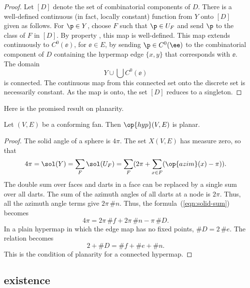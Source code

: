 \begin{proof} Let $[D]$ denote the set of combinatorial components of
$D$.  There is a well-defined continuous (in fact, locally constant)
function from $Y$ onto $[D]$ given as follows.  For $\p\in Y$,
choose $F$ such that $\p\in U_F$ and send $\p$ to the class of $F$
in $[D]$.  By property , this map is
well-defined. This map extends continuously to $C^0(\ee)$, for
$\ee\in E$, by sending $\p\in C^0(\ee)$ to the combinatorial
component of $D$ containing the hypermap edge $\{x,y\}$  that
corresponds with $\ee$.  The domain
\begin{displaymath}
Y\cup \bigcup C^0(\ee)
\end{displaymath}
is connected.  The continuous map from this connected set onto the
discrete set is necessarily constant.  As the map is onto, the set
$[D]$ reduces to a singleton.
\end{proof}

Here is the promised result on planarity.

\begin{lemma}[]  
\label{lemma:cfplanar}
Let $(V,E)$ be a conforming fan.  
Then $\op{hyp}(V,E)$ is planar.
\end{lemma}
%
%

\begin{proof}  The solid angle of a sphere is $4\pi$.  The set $X(V,E)$
has measure zero, so that
\begin{equation}\label{eqn:solid-sum}
4\pi = \sol(Y)= \sum_F \sol(U_F) = 
\sum_F ( 2\pi + \sum_{x\in F} (\op{azim}(x)-\pi) ).
\end{equation}
The double sum over faces and darts in a face can be replaced by
a single sum over all darts.  
The sum of the azimuth angles of all darts at a node is $2\pi$. Thus,
all the azimuth angle terms give $2\pi\,\#n$.
Thus, the formula~(\ref{eqn:solid-sum}) becomes
\begin{displaymath}
4\pi = 2\pi\, \#f +2\pi\,\#n - \pi\, \#D.
\end{displaymath}
In a plain hypermap in which the edge map has no fixed points, $\#D =
2\,\#e$.  The relation becomes
\begin{displaymath}
2 + \#D = \#f + \#e + \#n.
\end{displaymath}
This is the condition of planarity for a connected hypermap.
\end{proof}
%

\subsection{existence}




